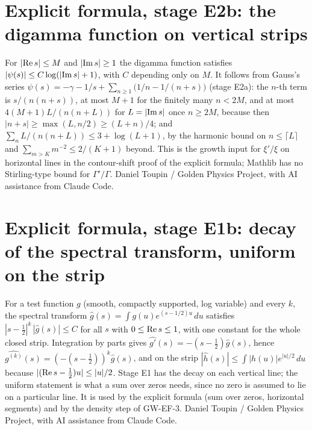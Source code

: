 \documentclass{report}
\theoremstyle{definition}
\begin{document}
\begin{itemize}
\begin{itemize}
\section{Explicit formula, stage E2b: the digamma function on vertical strips}
For $|{\rm Re}\,s|\le M$ and $|{\rm Im}\,s|\ge1$ the digamma function satisfies $|\psi(s)|\le C\log(|{\rm Im}\,s|+1)$, with $C$ depending only on $M$. It follows from Gauss's series $\psi(s)=-\gamma-1/s+\sum_{n\ge1}\bigl(1/n-1/(n+s)\bigr)$ (stage E2a): the $n$-th term is $s/(n(n+s))$, at most $M+1$ for the finitely many $n<2M$, and at most $4(M+1)L/(n(n+L))$ for $L=|{\rm Im}\,s|$ once $n\ge2M$, because then $|n+s|\ge\max(L,n/2)\ge(L+n)/4$; and $\sum_{n}L/(n(n+L))\le3+\log(L+1)$, by the harmonic bound on $n\le\lceil L\rceil$ and $\sum_{m>K}m^{-2}\le2/(K+1)$ beyond. This is the growth input for $\xi'/\xi$ on horizontal lines in the contour-shift proof of the explicit formula; Mathlib has no Stirling-type bound for $\Gamma'/\Gamma$.
Daniel Toupin / Golden Physics Project, with AI assistance from Claude Code.


\section{Explicit formula, stage E1b: decay of the spectral transform, uniform on the strip}
For a test function $g$ (smooth, compactly supported, log variable) and every $k$, the spectral transform $\hat g(s)=\int g(u)e^{(s-1/2)u}\,du$ satisfies $|s-\tfrac12|^k\,|\hat g(s)|\le C$ for all $s$ with $0\le{\rm Re}\,s\le1$, with one constant for the whole closed strip. Integration by parts gives $\widehat{g'}(s)=-(s-\tfrac12)\hat g(s)$, hence $\widehat{g^{(k)}}(s)=(-(s-\tfrac12))^k\hat g(s)$, and on the strip $|\hat h(s)|\le\int|h(u)|e^{|u|/2}\,du$ because $|({\rm Re}\,s-\tfrac12)u|\le|u|/2$. Stage E1 has the decay on each vertical line; the uniform statement is what a sum over zeros needs, since no zero is assumed to lie on a particular line. It is used by the explicit formula (sum over zeros, horizontal segments) and by the density step of GW-EF-3.
Daniel Toupin / Golden Physics Project, with AI assistance from Claude Code.



\end{itemize}
\end{itemize}
\end{document}
